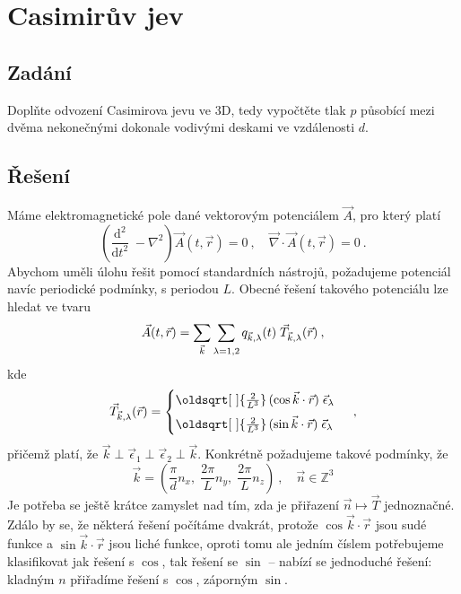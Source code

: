 \documentclass[10pt,a4paper]{article}
\renewcommand*{\sqrt}[2][\ ]{\oldsqrt[#1]{#2\,}\,}
\def\vph{\vphantom}
\newcommand{\const}[1]{\text{#1}}
\newcommand{\dd}[2]{\frac{\const{d} #1}{\const{d} #2} \;}
\def\Z{\mathbb{Z}}
\begin{document}
\section{Casimirův jev}

\subsection{Zadání}
Doplňte odvození Casimirova jevu ve 3D, tedy vypočtěte tlak $p$ působící mezi dvěma nekonečnými dokonale vodivými deskami ve vzdálenosti $d$.

\subsection{Řešení}
Máme elektromagnetické pole dané vektorovým potenciálem $\vec A$, pro který platí
\begin{equation*}
    \left(\dd{^2}{t^2} - \nabla^2\right)
    \vec A(t, \vec r) = 0
    \: , \quad
    \vec\nabla \cdot \vec A(t, \vec r) = 0
    \: .
\end{equation*}
Abychom uměli úlohu řešit pomocí standardních nástrojů, požadujeme potenciál navíc periodické podmínky, s periodou $L$. Obecné řešení takového potenciálu lze hledat ve tvaru
\begin{equation*}
    \vec A(t, \vec r)
    =
    \sum_{\vec k}
    \sum_{\vph{\vec k} \lambda = 1, 2}
    q_{\vec k, \lambda}(t) \;
    \vec T_{\vec k, \lambda}(\vec r)
    \: ,
\end{equation*}
kde
\begin{equation*}
    \vec T_{\vec k, \lambda}(\vec r)
    = \begin{cases}
        \sqrt{\frac{2}{L^3}\!}
        (\cos \vec k \cdot \vec r) \;
        \vec\epsilon_\lambda
        \\[5pt]
        \sqrt{\frac{2}{L^3}\!}
        (\sin \vec k \cdot \vec r) \;
        \vec\epsilon_\lambda
    \end{cases}
    \: ,
\end{equation*}
přičemž platí, že $\vec k \perp \vec\epsilon_1 \perp \vec\epsilon_2 \perp \vec k$.
Konkrétně požadujeme takové podmínky, že
\begin{equation*}
    \vec k = \left(
        \frac{\pi}{d} n_x, \;
        \frac{2\pi}{L} n_y, \;
        \frac{2\pi}{L} n_z
    \right)
    \: , \quad
    \vec n \in \Z^3
\end{equation*}
Je potřeba se ještě krátce zamyslet nad tím, zda je přiřazení $\vec n \mapsto \vec T$ jednoznačné. Zdálo by se, že některá řešení počítáme dvakrát, protože $\cos  \vec k \cdot \vec r$ jsou sudé funkce a $\sin \vec k \cdot \vec r$ jsou liché funkce, oproti tomu ale jedním číslem potřebujeme klasifikovat jak řešení s $\cos$, tak řešení se $\sin$ – nabízí se jednoduché řešení: kladným $n$ přiřadíme řešení s $\cos$, záporným $\sin$.
\end{document}
